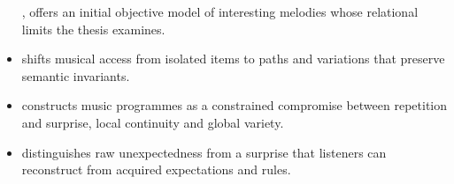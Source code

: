 \documentclass[11pt,a4paper]{article}
\begin{document}
\begin{itemize}
        \textcite{pachet2006clefs}, offers an initial objective model of
        interesting melodies whose relational limits the thesis examines.
  \item \textcite{pachet1999active} shifts musical access from isolated items to
        paths and variations that preserve semantic invariants.
  \item \textcite{pachet1999programs} constructs music programmes as a constrained
        compromise between repetition and surprise, local continuity and global
        variety.
  \item \textcite{pachet1999surprising} distinguishes raw unexpectedness from a
        surprise that listeners can reconstruct from acquired expectations and
        rules.
\end{itemize}

\printbibliography[keyword={francois-pachet},title={Works by François Pachet}]
\printbibliography[notkeyword={francois-pachet},title={Other references}]
\end{document}
